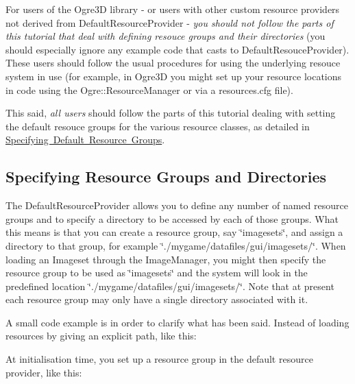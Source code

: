 For users of the Ogre3D library -\/ or users with other custom resource providers not derived from Default\+Resource\+Provider -\/ {\itshape you should not follow the parts of this tutorial that deal with defining resouce groups and their directories} (you should especially ignore any example code that casts to Default\+Resouce\+Provider). These users should follow the usual procedures for using the underlying resouce system in use (for example, in Ogre3D you might set up your resource locations in code using the Ogre\+::\+Resource\+Manager or via a resources.\+cfg file).

This said, {\itshape all users} should follow the parts of this tutorial dealing with setting the default resouce groups for the various resource classes, as detailed in \mbox{\hyperlink{resprov_tutorial_resprov_tutorial_default_resource_groups}{Specifying Default Resource Groups}}.\hypertarget{resprov_tutorial_resprov_tutorial_default_rp_groups}{}\subsection{Specifying Resource Groups and Directories}\label{resprov_tutorial_resprov_tutorial_default_rp_groups}
The Default\+Resource\+Provider allows you to define any number of named resource groups and to specify a directory to be accessed by each of those groups. What this means is that you can create a resource group, say {\ttfamily \char`\"{}imagesets\char`\"{}}, and assign a directory to that group, for example {\ttfamily \char`\"{}./mygame/datafiles/gui/imagesets/\char`\"{}}. When loading an Imageset through the Image\+Manager, you might then specify the resource group to be used as {\ttfamily \char`\"{}imagesets\char`\"{}} and the system will look in the predefined location {\ttfamily \char`\"{}./mygame/datafiles/gui/imagesets/\char`\"{}}. Note that at present each resource group may only have a single directory associated with it.

A small code example is in order to clarify what has been said. Instead of loading resources by giving an explicit path, like this\+: 
\begin{DoxyCode}{0}
\DoxyCodeLine{    \textcolor{stringliteral}{"./mygame/datafiles/gui/imagesets/WindowsLook.imageset"});}
\end{DoxyCode}


At initialisation time, you set up a resource group in the default resource provider, like this\+: 
\begin{DoxyCode}{0}
\DoxyCodeLine{}
\end{DoxyCode}


